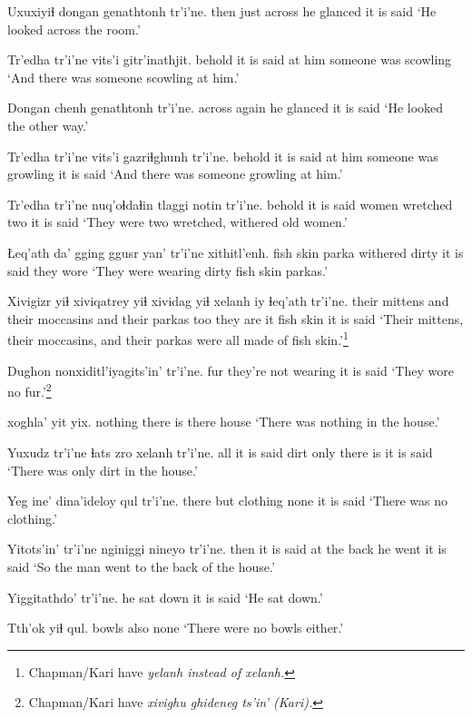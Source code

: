 \documentclass[12pt]{article}
\begin{document}
\gll Uxuxiyiɬ dongan genathtonh tr'i'ne.
then {just across}  {he glanced} {it is said}
\glt `He looked across the room.'
\glend

\gll Tr'edha tr'i'ne vits'i gitr'inathjit.
behold  {it is said} {at him} {someone was scowling}
\glt `And there was someone scowling at him.'
\glend

\gll Dongan chenh genathtonh tr'i'ne.
across  again {he glanced} {it is said}
\glt `He looked the other way.'
\glend

\gll Tr'edha tr'i'ne vits'i gazriɬghunh  tr'i'ne.
behold  {it is said} {at him} {someone was growling} {it is said}
\glt `And there was someone growling at him.'
\glend

\gll Tr'edha tr'i'ne nuq'oɬdaɬin tlaggi  notin tr'i'ne.
behold  {it is said} women  wretched two {it is said}
\glt `They were two wretched, withered old women.'
\glend

\gll Łeq'ath da' gging {ggusr yan'} tr'i'ne xithitl'enh.
{fish skin} parka withered dirty {it is said} {they wore}
\glt `They were wearing dirty fish skin parkas.'
\glend

\gll Xivigizr yiɬ xiviqatrey  yiɬ xividag  yiɬ xelanh iy ɬeq'ath tr'i'ne.
{their mittens} and {their moccasins} and {their parkas} too {they are} it fish skin {it is said}
\glt `Their mittens, their moccasins, and their parkas were all made of fish skin.'\footnote{Chapman/Kari have \em yelanh \em instead of \em xelanh.}
\glend

\gll Dughon {nonxiditl'iyagits'in'} tr'i'ne.
fur  {they're not wearing}  {it is said}
\glt `They wore no fur.'\footnote{Chapman/Kari have \em xivighu ghideneg ts'in' \em (Kari).}
\glend

 xoghla' yit yix.
nothing {there is} there house
\glt `There was nothing in the house.'
\glend

\gll Yuxudz tr'i'ne ɬats zro xelanh tr'i'ne.
all  {it is said} dirt only {there is} {it is said}
\glt `There was only dirt in the house.'
\glend

\gll Yeg ine' dina'ideloy qul tr'i'ne.
there but clothing none {it is said}
\glt `There was no clothing.'
\glend

\gll Yitots'in' tr'i'ne nginiggi nineyo tr'i'ne. 
then  {it is said} {at the back} {he went} {it is said} 
\glt `So the man went to the back of the house.'
\glend

\gll Yiggitathdo' tr'i'ne.
{he sat down} {it is said}
\glt `He sat down.'
\glend

\gll Tth'ok yiɬ qul.
bowls  also none
\glt `There were no bowls either.'
\glend
\end{document}
